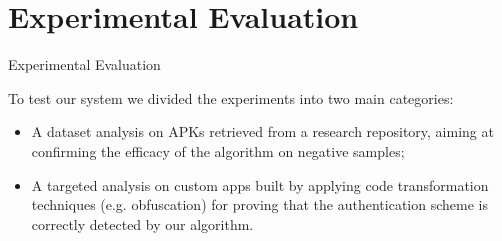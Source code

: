 \documentclass[10pt]{beamer}
\begin{document}



 
 


\section{Experimental Evaluation}
\begin{frame}[fragile]{Experimental Evaluation}

  To test our system we divided the experiments into two main categories:
  \begin{itemize}

  \item A dataset analysis on APKs retrieved from a research
    repository, aiming at confirming the efficacy of the
    algorithm on negative samples;

  \item A targeted analysis on custom apps built by applying code
    transformation techniques (e.g. obfuscation) for proving that the
    authentication scheme is correctly detected by our algorithm.
      
  \end{itemize}
	
\end{frame}
\end{document}
